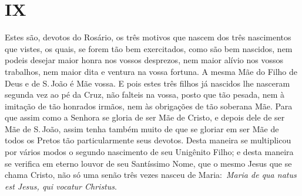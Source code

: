 \section{IX}

Estes são, devotos do Rosário, os três motivos que nascem
dos três nascimentos que vistes, os quais, se forem tão bem exercitados,
como são bem nascidos, nem podeis desejar maior honra nos vossos
desprezos, nem maior alívio nos vossos trabalhos, nem maior dita e
ventura na vossa fortuna. A mesma Mãe do Filho de Deus e de S.\,João é
Mãe vossa. E pois estes três filhos já nascidos lhe nasceram segunda vez
ao pé da Cruz, não falteis na vossa, posto que tão pesada, nem à
imitação de tão honrados irmãos, nem às obrigações de tão soberana Mãe.
Para que assim como a Senhora se gloria de ser Mãe de Cristo, e depois
dele de ser Mãe de S.\,João, assim tenha também muito de que se gloriar
em ser Mãe de todos os Pretos tão particularmente seus devotos. Desta
maneira se multiplicou por vários modos o segundo nascimento de seu
Unigênito Filho; e desta maneira se verifica em eterno louvor de seu
Santíssimo Nome, que o mesmo Jesus que se chama Cristo, não só uma senão
três vezes nasceu de Maria:~\emph{Maria de qua natus est Jesus, qui
vocatur Christus}.

